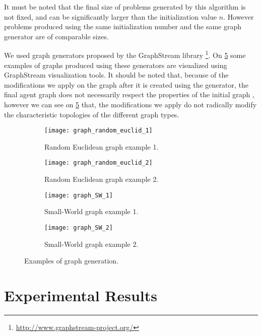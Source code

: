 It must be noted that the final size of problems generated by this algorithm is not fixed, and can be significantly larger than the initialization value $n$. However problems produced using the same initialization number and the same graph generator are of comparable sizes.

We used graph generators proposed by the GraphStream library \footnote{\url{http://www.graphstream-project.org/}}. On \figurename{} \ref{graph_generation_examples} some examples of graphs produced using these generators are visualized using GraphStream visualization tools. It should be noted that, because  of the modifications we apply on the graph after it is created using the generator, the final agent graph does not necessarily respect the properties of the initial graph , however we can see on \figurename{} \ref{graph_generation_examples} that, the modifications we apply do not radically modify the characteristic topologies of the different graph types.
 
\begin{figure}
\centering
	\begin{subfigure}[b]{0.45\textwidth}
		\texttt{[image: graph\_random\_euclid\_1]}
		\caption{Random Euclidean graph example 1.}\label{generatedgraphs:rand1}
	\end{subfigure}
	\begin{subfigure}[b]{0.45\textwidth}
			\texttt{[image: graph\_random\_euclid\_2]}
		\caption{Random Euclidean graph example 2.}\label{generatedgraphs:rand2}
	\end{subfigure}
	
	\begin{subfigure}[b]{0.45\textwidth}
		\texttt{[image: graph\_SW\_1]}
		\caption{Small-World graph example 1.}\label{generatedgraphs:sw1}
	\end{subfigure}
	\begin{subfigure}[b]{0.45\textwidth}
			\texttt{[image: graph\_SW\_2]}
		\caption{Small-World graph example 2.}\label{generatedgraphs:sw2}
	\end{subfigure}

\caption{Examples of graph generation.}
\label{graph_generation_examples}
\end{figure}

\section{Experimental Results}

